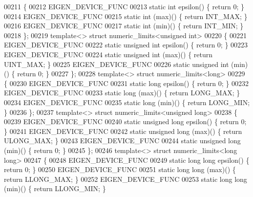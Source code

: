 \begin{DoxyCode}
00211 \{
00212   EIGEN\_DEVICE\_FUNC
00213   \textcolor{keyword}{static} \textcolor{keywordtype}{int} epsilon() \{ \textcolor{keywordflow}{return} 0; \}
00214   EIGEN\_DEVICE\_FUNC
00215   \textcolor{keyword}{static} int (max)() \{ \textcolor{keywordflow}{return} INT\_MAX; \}
00216   EIGEN\_DEVICE\_FUNC
00217   \textcolor{keyword}{static} int (min)() \{ \textcolor{keywordflow}{return} INT\_MIN; \}
00218 \};
00219 \textcolor{keyword}{template}<> \textcolor{keyword}{struct }numeric\_limits<unsigned int>
00220 \{
00221   EIGEN\_DEVICE\_FUNC
00222   \textcolor{keyword}{static} \textcolor{keywordtype}{unsigned} \textcolor{keywordtype}{int} epsilon() \{ \textcolor{keywordflow}{return} 0; \}
00223   EIGEN\_DEVICE\_FUNC
00224   \textcolor{keyword}{static} \textcolor{keywordtype}{unsigned} int (max)() \{ \textcolor{keywordflow}{return} UINT\_MAX; \}
00225   EIGEN\_DEVICE\_FUNC
00226   \textcolor{keyword}{static} \textcolor{keywordtype}{unsigned} int (min)() \{ \textcolor{keywordflow}{return} 0; \}
00227 \};
00228 \textcolor{keyword}{template}<> \textcolor{keyword}{struct }numeric\_limits<long>
00229 \{
00230   EIGEN\_DEVICE\_FUNC
00231   \textcolor{keyword}{static} \textcolor{keywordtype}{long} epsilon() \{ \textcolor{keywordflow}{return} 0; \}
00232   EIGEN\_DEVICE\_FUNC
00233   \textcolor{keyword}{static} long (max)() \{ \textcolor{keywordflow}{return} LONG\_MAX; \}
00234   EIGEN\_DEVICE\_FUNC
00235   \textcolor{keyword}{static} long (min)() \{ \textcolor{keywordflow}{return} LONG\_MIN; \}
00236 \};
00237 \textcolor{keyword}{template}<> \textcolor{keyword}{struct }numeric\_limits<unsigned long>
00238 \{
00239   EIGEN\_DEVICE\_FUNC
00240   \textcolor{keyword}{static} \textcolor{keywordtype}{unsigned} \textcolor{keywordtype}{long} epsilon() \{ \textcolor{keywordflow}{return} 0; \}
00241   EIGEN\_DEVICE\_FUNC
00242   \textcolor{keyword}{static} \textcolor{keywordtype}{unsigned} long (max)() \{ \textcolor{keywordflow}{return} ULONG\_MAX; \}
00243   EIGEN\_DEVICE\_FUNC
00244   \textcolor{keyword}{static} \textcolor{keywordtype}{unsigned} long (min)() \{ \textcolor{keywordflow}{return} 0; \}
00245 \};
00246 \textcolor{keyword}{template}<> \textcolor{keyword}{struct }numeric\_limits<long long>
00247 \{
00248   EIGEN\_DEVICE\_FUNC
00249   \textcolor{keyword}{static} \textcolor{keywordtype}{long} \textcolor{keywordtype}{long} epsilon() \{ \textcolor{keywordflow}{return} 0; \}
00250   EIGEN\_DEVICE\_FUNC
00251   \textcolor{keyword}{static} \textcolor{keywordtype}{long} long (max)() \{ \textcolor{keywordflow}{return} LLONG\_MAX; \}
00252   EIGEN\_DEVICE\_FUNC
00253   \textcolor{keyword}{static} \textcolor{keywordtype}{long} long (min)() \{ \textcolor{keywordflow}{return} LLONG\_MIN; \}

\end{DoxyCode}
